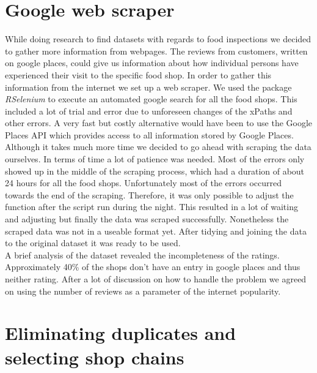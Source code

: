 \documentclass{article}
\begin{document}
\section{Google web scraper}

While doing research to find datasets with regards to food inspections we decided to gather more information from webpages. The reviews from customers, written on google places, could give us information about how individual persons have experienced their visit to the specific food shop. In order to gather this information from the internet we set up a web scraper. We used the package \textit{RSelenium} to execute an automated google search for all the food shops. This included a lot of trial and error due to unforeseen changes of the xPaths and other errors. A very fast but costly alternative would have been to use the Google Places API which provides access to all information stored by Google Places. Although it takes much more time we decided to go ahead with scraping the data ourselves. In terms of time a lot of patience was needed. Most of the errors only showed up in the middle of the scraping process, which had a duration of about 24 hours for all the food shops. Unfortunately most of the errors occurred towards the end of the scraping. Therefore, it was only possible to adjust the function after the script run during the night. This resulted in a lot of waiting and adjusting but finally the data was scraped successfully. Nonetheless the scraped data was not in a useable format yet. After tidying and joining the data to the original dataset it was ready to be used. \\

A brief analysis of the dataset revealed the incompleteness of the ratings. Approximately 40\% of the shops don't have an entry in google places and thus neither rating. After a lot of discussion on how to handle the problem we agreed on using the number of reviews as a parameter of the internet popularity. 

\section{Eliminating duplicates and selecting shop chains}
\end{document}
